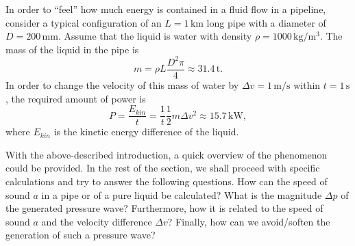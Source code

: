 In order to ``feel'' how much energy is contained in a fluid flow in a pipeline, consider a typical configuration of an $L=1\,\mathrm{km}$ long pipe with a diameter of $D=200\,\mathrm{mm}$. Assume that the liquid is water with density $\rho=1000\,\mathrm{kg/m^3}$. The mass of the liquid in the pipe is
%
\begin{equation}
m = \rho L \frac{D^2 \pi}{4} \approx 31.4\,\mathrm{t}.
\end{equation}
%
In order to change the velocity of this mass of water by $\Delta v=1\,\mathrm{m/s}$ within $t=1\,\mathrm{s}$, the required amount of power is
%
\begin{equation}
P = \frac{E_{kin}}{t} = \frac{1}{t} \frac{1}{2} m \Delta v^2 \approx 15.7\,\mathrm{kW},
\end{equation}
%
where $E_{kin}$ is the kinetic energy difference of the liquid.

With the above-described introduction, a quick overview of the phenomenon could be provided. In the rest of the section, we shall proceed with specific calculations and try to answer the following questions. How can the speed of sound $a$ in a pipe or of a pure liquid be calculated? What is the magnitude $\Delta p$ of the generated pressure wave? Furthermore, how it is related to the speed of sound $a$ and the velocity difference $\Delta v$? Finally, how can we avoid/soften the generation of such a pressure wave?

